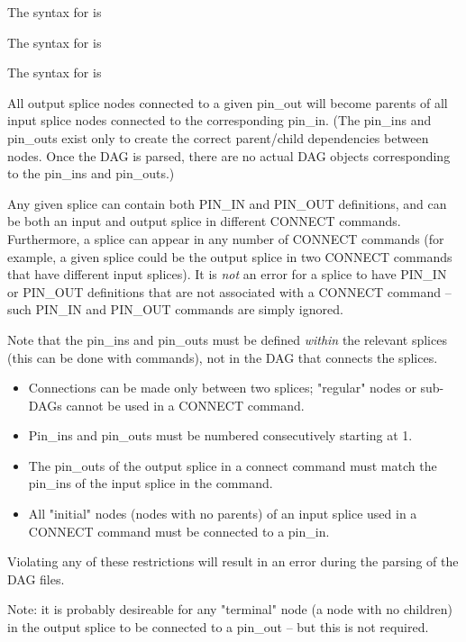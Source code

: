 The syntax for  is

  

The syntax for  is

  

The syntax for  is

  

All output splice nodes connected to a given pin\_out will become
parents of all input splice nodes connected to the corresponding
pin\_in.  (The pin\_ins and pin\_outs exist only to create the
correct parent/child dependencies between nodes.  Once the
DAG is parsed, there are no actual DAG objects corresponding
to the pin\_ins and pin\_outs.)

Any given splice can contain both PIN\_IN and PIN\_OUT definitions,
and can be both an input and output splice in different CONNECT
commands.  Furthermore, a splice can appear in any number of
CONNECT commands (for example, a given splice could be the output
splice in two CONNECT commands that have different input splices).
It is \emph{not} an error for a splice to have PIN\_IN or PIN\_OUT
definitions that are not associated with a CONNECT command -- such
PIN\_IN and PIN\_OUT commands are simply ignored.

Note that the pin\_ins and pin\_outs must be defined \emph{within}
the relevant splices (this can be done with  commands), not
in the DAG that connects the splices.


\begin{itemize}
\item Connections can be made only between two splices; "regular"
nodes or sub-DAGs cannot be used in a CONNECT command.
\item Pin\_ins and pin\_outs must be numbered consecutively starting
at 1.
\item The pin\_outs of the output splice in a connect command must
match the pin\_ins of the input splice in the command.
\item All "initial" nodes (nodes with no parents) of an input splice
used in a CONNECT command must be connected to a pin\_in.
\end{itemize}
Violating any of these restrictions will result in an error during
the parsing of the DAG files.

Note:  it is probably desireable for any "terminal" node (a
node with no children) in the output splice to be connected to
a pin\_out -- but this is not required.

